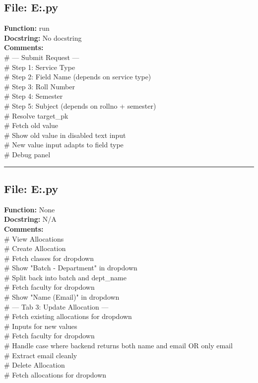 {\subsection*{File: E:\project\capstone\frontend\faculty\request.py}
\textbf{Function:} run\\
\textbf{Docstring:} No docstring\\
\textbf{Comments:}\\
# --- Submit Request ---\\
# Step 1: Service Type\\
# Step 2: Field Name (depends on service type)\\
# Step 3: Roll Number\\
# Step 4: Semester\\
# Step 5: Subject (depends on rollno + semester)\\
# Resolve target\_pk\\
# Fetch old value\\
# Show old value in disabled text input\\
# New value input adapts to field type\\
# Debug panel\\

\hrule

\subsection*{File: E:\project\capstone\frontend\hod\CF.py}
\textbf{Function:} None\\
\textbf{Docstring:} N/A\\
\textbf{Comments:}\\
# View Allocations\\
# Create Allocation\\
# Fetch classes for dropdown\\
# Show "Batch - Department" in dropdown\\
# Split back into batch and dept\_name\\
# Fetch faculty for dropdown\\
# Show "Name (Email)" in dropdown\\
# --- Tab 3: Update Allocation ---\\
# Fetch existing allocations for dropdown\\
# Inputs for new values\\
# Fetch faculty for dropdown\\
# Handle case where backend returns both name and email OR only email\\
# Extract email cleanly\\
# Delete Allocation\\
# Fetch allocations for dropdown\\

}
